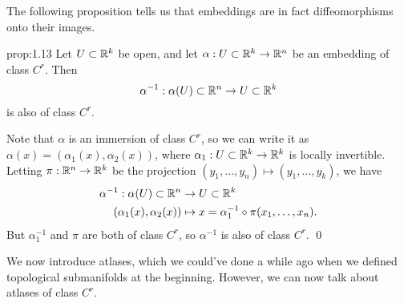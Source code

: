 The following proposition tells us that embeddings are in fact 
diffeomorphisms onto their images. 
\begin{prop}{prop:1.13}
    Let $U \subset \mathbb{R}^k$ be open, and let $\alpha : U \subset \mathbb{R}^k \to 
    \mathbb{R}^n$ be an embedding of class $C^r$. Then 
    \[ \alpha^{-1} : \alpha(U) \subset \mathbb{R}^n \to U \subset \mathbb{R}^k \] 
    is also of class $C^r$. 
\end{prop}\vspace{-0.25cm}
\begin{pf}
    Note that $\alpha$ is an immersion of class $C^r$, so we can write it as 
    $\alpha(x) = (\alpha_1(x), \alpha_2(x))$,
    where $\alpha_1 : U \subset \mathbb{R}^k \to \mathbb{R}^k$ is locally invertible. 
    Letting $\pi : \mathbb{R}^n \to \mathbb{R}^k$ be the projection $(y_1, \dots, y_n) 
    \mapsto (y_1, \dots, y_k)$, we have 
    \begin{align*} 
        \alpha^{-1} : \alpha(U) \subset \mathbb{R}^n &\to U \subset \mathbb{R}^k \\ 
        (\alpha_1(x), \alpha_2(x)) &\mapsto x = \alpha_1^{-1} \circ 
        \pi(x_1, \dots, x_n).
    \end{align*}
    But $\alpha_1^{-1}$ and $\pi$ are both of class $C^r$, so 
    $\alpha^{-1}$ is also of class $C^r$. \qed 
\end{pf}\vspace{-0.25cm}
We now introduce atlases, which we could've done a while ago when we 
defined topological submanifolds at the beginning. However, we can now 
talk about atlases of class $C^r$.

